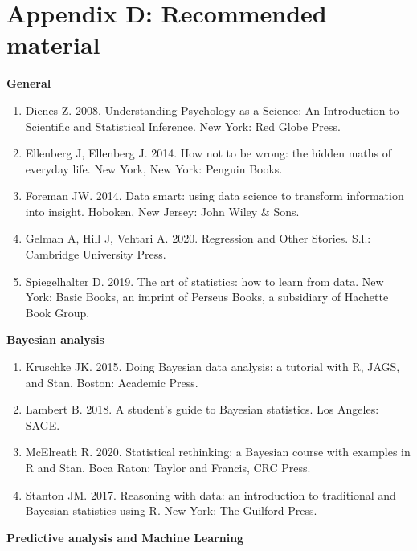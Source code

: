 \documentclass[
]{book}
\begin{document}
\hypertarget{appendix-d-recommended-material}{%
\chapter{Appendix D: Recommended material}\label{appendix-d-recommended-material}}

\textbf{General}

\begin{enumerate}
\def\labelenumi{\arabic{enumi}.}
\item
  Dienes Z. 2008. Understanding Psychology as a Science: An Introduction to Scientific and Statistical Inference. New York: Red Globe Press.
\item
  Ellenberg J, Ellenberg J. 2014. How not to be wrong: the hidden maths of everyday life. New York, New York: Penguin Books.
\item
  Foreman JW. 2014. Data smart: using data science to transform information into insight. Hoboken, New Jersey: John Wiley \& Sons.
\item
  Gelman A, Hill J, Vehtari A. 2020. Regression and Other Stories. S.l.: Cambridge University Press.
\item
  Spiegelhalter D. 2019. The art of statistics: how to learn from data. New York: Basic Books, an imprint of Perseus Books, a subsidiary of Hachette Book Group.
\end{enumerate}

\textbf{Bayesian analysis}

\begin{enumerate}
\def\labelenumi{\arabic{enumi}.}
\setcounter{enumi}{6}
\item
  Kruschke JK. 2015. Doing Bayesian data analysis: a tutorial with R, JAGS, and Stan. Boston: Academic Press.
\item
  Lambert B. 2018. A student's guide to Bayesian statistics. Los Angeles: SAGE.
\item
  McElreath R. 2020. Statistical rethinking: a Bayesian course with examples in R and Stan. Boca Raton: Taylor and Francis, CRC Press.
\item
  Stanton JM. 2017. Reasoning with data: an introduction to traditional and Bayesian statistics using R. New York: The Guilford Press.
\end{enumerate}

\textbf{Predictive analysis and Machine Learning}
\end{document}
